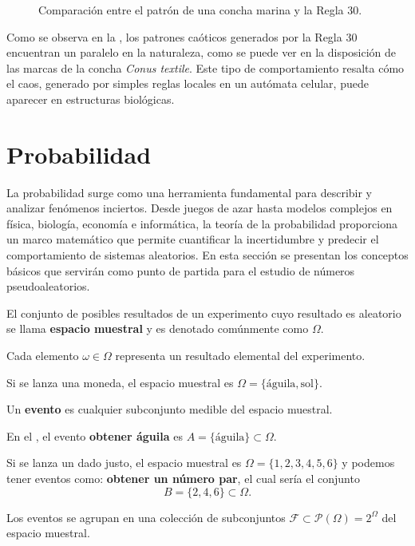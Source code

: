 \documentclass[../Main.tex]{subfiles}
\begin{document}
\begin{figure}[h!]
\hfill
{}
\hfill
{}
\hfill
\caption{Comparación entre el patrón de una concha marina y la Regla 30.}
\label{fig:R30-comp}
\end{figure}

Como se observa en la , los patrones caóticos generados por la Regla 30 encuentran un paralelo en la naturaleza, como se puede ver en la disposición de las marcas de la concha \textit{Conus textile}. Este tipo de comportamiento resalta cómo el caos, generado por simples reglas locales en un autómata celular, puede aparecer en estructuras biológicas.

\section{Probabilidad}
La probabilidad surge como una herramienta fundamental para describir y analizar fenómenos inciertos. Desde juegos de azar hasta modelos complejos en física, biología, economía e informática, la teoría de la probabilidad proporciona un marco matemático que permite cuantificar la incertidumbre y predecir el comportamiento de sistemas aleatorios. En esta sección se presentan los conceptos básicos que servirán como punto de partida para el estudio de números pseudoaleatorios.

\begin{definition}
\label{}
El conjunto de posibles resultados de un experimento cuyo resultado es aleatorio se llama \textbf{espacio muestral} y es denotado comúnmente como $\Omega$. 
\end{definition}
Cada elemento $\omega \in \Omega$ representa un resultado elemental del experimento. 
\begin{example}
\label{}
    Si se lanza una moneda, el espacio muestral es $\Omega = \{\text{águila}, \text{sol}\}$.
    \label{ej:moneda}
\end{example}
\begin{definition}
\label{}
Un \textbf{evento} es cualquier subconjunto medible del espacio muestral.
\end{definition}
En el , el evento \textbf{obtener águila} es $A = \{\text{águila}\}\subset \Omega$. 
\begin{example}
\label{}
    Si se lanza un dado justo, el espacio muestral es  $\Omega =\{1,2,3,4,5,6\}$ y podemos tener eventos como: \textbf{obtener un número par}, el cual sería el conjunto $$B=\{2,4,6\}\subset \Omega.$$
\end{example}
Los eventos se agrupan en una colección de subconjuntos $\mathcal{F}\subset \mathcal{P}(\Omega)=2^{\Omega}$ del espacio muestral. 
\end{document}
